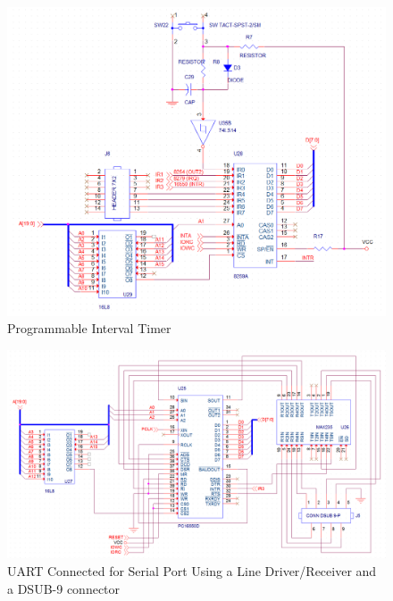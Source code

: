         \begin{figure}[ht]
            \begin{center}
                \includegraphics[width=1\textwidth]{figures/schematics/pic.png}
                \caption{Programmable Interval Timer} \label{fig:page7}
            \end{center}
        \end{figure}

        \begin{figure}[ht]
            \begin{center}
                \includegraphics[width=1\textwidth]{figures/schematics/uart.png}
                \caption{UART Connected for Serial Port Using a Line Driver/Receiver and a DSUB-9 connector} \label{fig:page8}
            \end{center}
        \end{figure}

